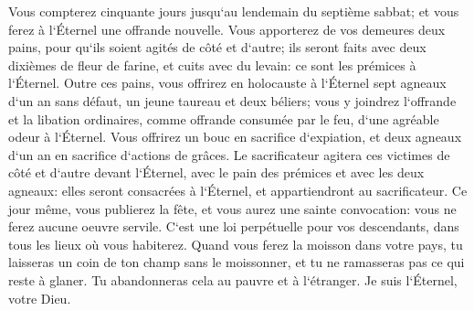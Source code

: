\verse Vous compterez cinquante jours jusqu`au lendemain du septième sabbat; et vous ferez à l`Éternel une offrande nouvelle. 
\verse Vous apporterez de vos demeures deux pains, pour qu`ils soient agités de côté et d`autre; ils seront faits avec deux dixièmes de fleur de farine, et cuits avec du levain: ce sont les prémices à l`Éternel. 
\verse Outre ces pains, vous offrirez en holocauste à l`Éternel sept agneaux d`un an sans défaut, un jeune taureau et deux béliers; vous y joindrez l`offrande et la libation ordinaires, comme offrande consumée par le feu, d`une agréable odeur à l`Éternel. 
\verse Vous offrirez un bouc en sacrifice d`expiation, et deux agneaux d`un an en sacrifice d`actions de grâces. 
\verse Le sacrificateur agitera ces victimes de côté et d`autre devant l`Éternel, avec le pain des prémices et avec les deux agneaux: elles seront consacrées à l`Éternel, et appartiendront au sacrificateur. 
\verse Ce jour même, vous publierez la fête, et vous aurez une sainte convocation: vous ne ferez aucune oeuvre servile. C`est une loi perpétuelle pour vos descendants, dans tous les lieux où vous habiterez. 
\verse Quand vous ferez la moisson dans votre pays, tu laisseras un coin de ton champ sans le moissonner, et tu ne ramasseras pas ce qui reste à glaner. Tu abandonneras cela au pauvre et à l`étranger. Je suis l`Éternel, votre Dieu. 
